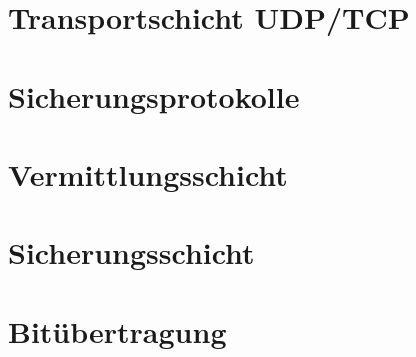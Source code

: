 \chapter{Transportschicht UDP/TCP}
%

\chapter{Sicherungsprotokolle}
%

\chapter{Vermittlungsschicht}
%

\chapter{Sicherungsschicht}
%

\chapter{Bitübertragung}



